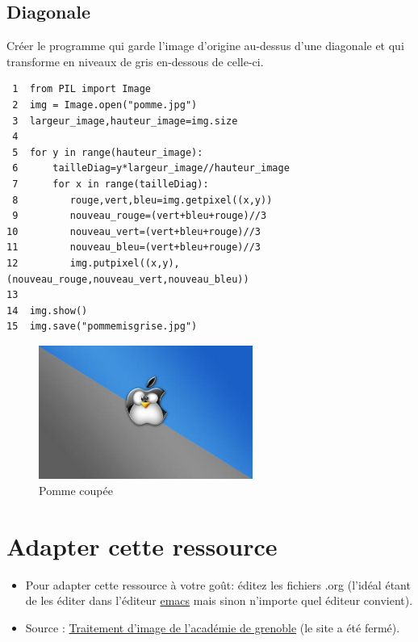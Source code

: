 \documentclass[11pt]{article}
\begin{document}
\subsection{Diagonale}
\label{sec:org7ec40e4}

Créer le programme qui garde l'image d'origine au-dessus d'une diagonale et qui transforme en niveaux de gris en-dessous de celle-ci.

\begin{verbatim}
 1  from PIL import Image
 2  img = Image.open("pomme.jpg")
 3  largeur_image,hauteur_image=img.size
 4  
 5  for y in range(hauteur_image):
 6      tailleDiag=y*largeur_image//hauteur_image
 7      for x in range(tailleDiag):
 8         rouge,vert,bleu=img.getpixel((x,y))
 9         nouveau_rouge=(vert+bleu+rouge)//3
10         nouveau_vert=(vert+bleu+rouge)//3
11         nouveau_bleu=(vert+bleu+rouge)//3
12         img.putpixel((x,y),(nouveau_rouge,nouveau_vert,nouveau_bleu))
13  
14  img.show()
15  img.save("pommemisgrise.jpg")
\end{verbatim}

\begin{figure}[htbp]
\centering
\includegraphics[width=7cm]{pommemisgrise.jpg}
\caption{Pomme coupée}
\end{figure}


\section{Adapter cette ressource}
\label{sec:org346a226}
\begin{itemize}
\item Pour adapter cette ressource à votre goût: éditez les fichiers .org (l'idéal étant de les éditer dans l'éditeur \href{https://linuxfr.org/users/postroutine/journaux/pourquoi-emacs-premiere-partie}{emacs} mais sinon n'importe quel éditeur convient).
\item Source : \href{http://www.ac-grenoble.fr/disciplines/informatiquelycee/n\_site/snt\_photo\_transImg.html}{Traitement d'image de l'académie de grenoble} (le site a été fermé).
\end{itemize}
\end{document}
